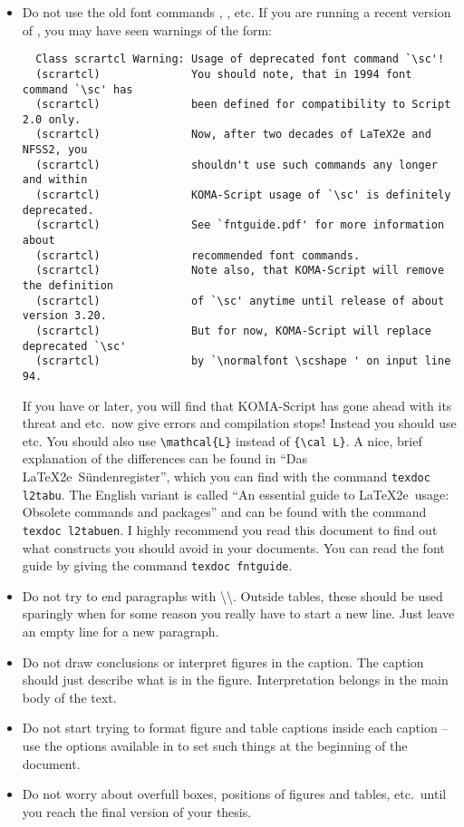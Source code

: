 \begin{itemize}
\item Do not use the old font commands , ,  etc.
  If you are running a recent version of \TeXLive, you may have seen warnings of the form:
  {\small
  \begin{verbatim}
  Class scrartcl Warning: Usage of deprecated font command `\sc'!
  (scrartcl)              You should note, that in 1994 font command `\sc' has
  (scrartcl)              been defined for compatibility to Script 2.0 only.
  (scrartcl)              Now, after two decades of LaTeX2e and NFSS2, you
  (scrartcl)              shouldn't use such commands any longer and within
  (scrartcl)              KOMA-Script usage of `\sc' is definitely deprecated.
  (scrartcl)              See `fntguide.pdf' for more information about
  (scrartcl)              recommended font commands.
  (scrartcl)              Note also, that KOMA-Script will remove the definition
  (scrartcl)              of `\sc' anytime until release of about version 3.20.
  (scrartcl)              But for now, KOMA-Script will replace deprecated `\sc'
  (scrartcl)              by `\normalfont \scshape ' on input line 94.
  \end{verbatim}
  }
  If you have  or later, you will find that KOMA-Script has gone ahead with its threat
  and  etc.\ now give errors and compilation stops!
  Instead you should use  etc.
  You should also use \verb|\mathcal{L}| instead of \verb|{\cal L}|.
  A nice, brief explanation of the differences can be found in \foreignlanguage{ngerman}{\enquote{Das \LaTeX2e\ Sündenregister}},
  which you can find with the command \texttt{texdoc l2tabu}.
  The English variant is called \enquote{An essential guide to \LaTeX2e\ usage: Obsolete commands and packages}
  and can be found with the command \texttt{texdoc l2tabuen}.
  I highly recommend you read this document to find out what constructs you should avoid in your documents.
  You can read the font guide by giving the command \texttt{texdoc fntguide}.

\item Do not try to end paragraphs with
  \textbackslash\textbackslash. 
  Outside tables, these should be used sparingly when
  for some reason you really have to start a new line.
  Just leave an empty line for a new paragraph.

\item Do not draw conclusions or interpret figures in the caption. The
  caption should just describe what is in the figure. Interpretation
  belongs in the main body of the text.

\item Do not start trying to format figure and table captions inside
  each caption -- use the options available in \KOMAScript{} to set
  such things at the beginning of the document.

\item Do not worry about overfull boxes, positions of figures
  and tables, etc.\ until you reach the final version of your thesis.
\end{itemize}


